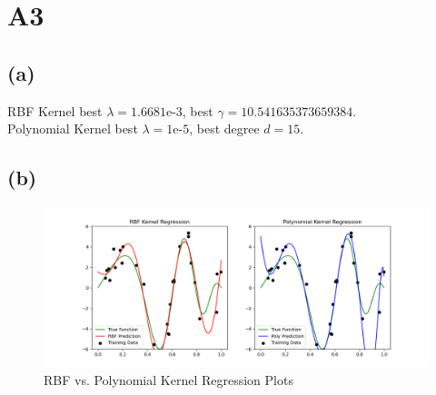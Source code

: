 \documentclass{article}
\begin{document}
\section*{A3}

\subsection*{(a)}
RBF Kernel best \(\lambda = 1.6681\text{e-3}\), best \(\gamma = 10.541635373659384\).\\
Polynomial Kernel best \(\lambda = 1\text{e-5}\), best degree \(d = 15\).

\subsection*{(b)}
\begin{figure}[htp]
    \centering
    \hspace*{-2in}\includegraphics[width=1.0\paperwidth]{rbf_vs_poly.png}
    \caption{RBF vs. Polynomial Kernel Regression Plots}
    \label{fig:enter-label}
\end{figure}
\end{document}
